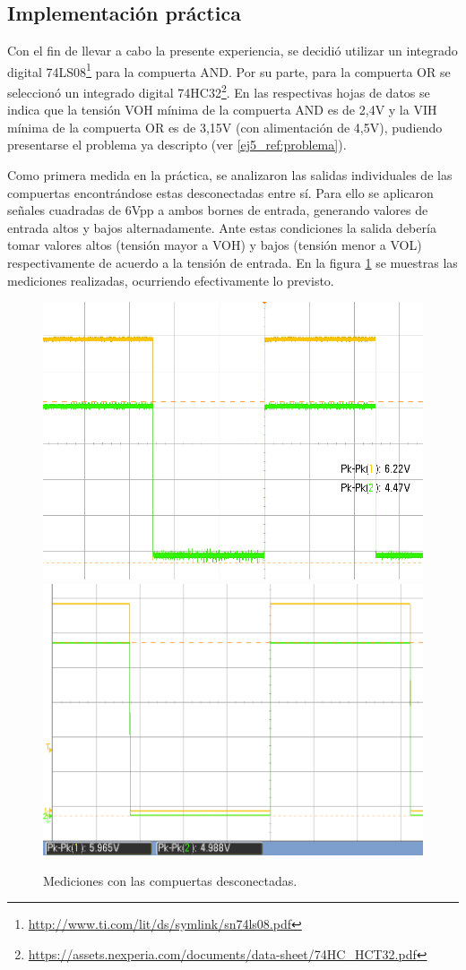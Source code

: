 \subsection{Implementaci\'on pr\'actica}
\noindent
Con el fin de llevar a cabo la presente experiencia, se decidi\'o utilizar un integrado digital 74LS08\footnote{\href{http://www.ti.com/lit/ds/symlink/sn74ls08.pdf}{http://www.ti.com/lit/ds/symlink/sn74ls08.pdf}} para la compuerta AND. Por su parte, para la compuerta OR se seleccion\'o un integrado digital 74HC32\footnote{\href{https://assets.nexperia.com/documents/data-sheet/74HC_HCT32.pdf}{https://assets.nexperia.com/documents/data-sheet/74HC_HCT32.pdf}}. En las respectivas hojas de datos se indica que la tensi\'on VOH m\'inima de la compuerta AND es de 2,4V y la VIH m\'inima de la compuerta OR es de 3,15V (con alimentaci\'on de 4,5V), pudiendo presentarse el problema ya descripto (ver \ref{ej5_ref:problema}).

\noindent
Como primera medida en la pr\'actica, se analizaron las salidas individuales de las compuertas encontr\'andose estas desconectadas entre s\'i. Para ello se aplicaron se\~nales cuadradas de 6Vpp a ambos bornes de entrada, generando valores de entrada altos y bajos alternadamente. Ante estas condiciones la salida deber\'ia tomar valores altos (tensi\'on mayor a VOH) y bajos (tensi\'on menor a VOL) respectivamente de acuerdo a la tensi\'on de entrada. En la figura \ref{ej5_fig:compuertas_desconectadas} se muestras las mediciones realizadas, ocurriendo efectivamente lo previsto.

\begin{figure}[H]
    \centering
    \includegraphics[width=.475\textwidth]{figs/ej5/and_cuadrada.png}\hfill
    \includegraphics[width=.475\textwidth]{figs/ej5/or_cuadrada.png}
    \caption{Mediciones con las compuertas desconectadas.}
    \label{ej5_fig:compuertas_desconectadas}
\end{figure}

